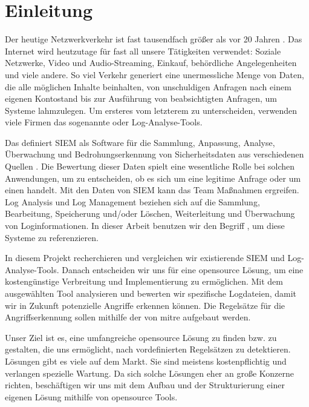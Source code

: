 \section{Einleitung}

Der heutige Netzwerkverkehr ist fast tausendfach größer als vor 20 Jahren \citep{Roser_I}. Das Internet wird heutzutage für fast all unsere Tätigkeiten verwendet: Soziale Netzwerke, Video und Audio-Streaming, Einkauf, behördliche Angelegenheiten und viele andere. So viel Verkehr generiert eine unermessliche Menge von Daten, die alle möglichen Inhalte beinhalten, von unschuldigen Anfragen nach einem eigenen Kontostand bis zur Ausführung von beabsichtigten Anfragen, um Systeme lahmzulegen. Um ersteres vom letzterem zu unterscheiden, verwenden viele Firmen das sogenannte  oder Log-Analyse-Tools. 

Das  definiert \gls{SIEM} als Software für die Sammlung, Anpassung, Analyse, Überwachung und Bedrohungserkennung von Sicherheitsdaten aus verschiedenen Quellen \citep{NIST_Definitions}. Die Bewertung dieser Daten spielt eine wesentliche Rolle bei solchen Anwendungen, um zu entscheiden, ob es sich um eine legitime Anfrage oder um einen  handelt. Mit den Daten von \gls{SIEM} kann das  Team Maßnahmen ergreifen. Log Analysis und Log Management beziehen sich auf die Sammlung, Bearbeitung, Speicherung und/oder Löschen, Weiterleitung und Überwachung von Loginformationen. In dieser Arbeit benutzen wir den Begriff , um diese Systeme zu referenzieren.

In diesem Projekt recherchieren und vergleichen wir existierende \gls{SIEM} und Log-Analyse-Tools. Danach entscheiden wir uns für eine \gls{opensource} Lösung, um eine kostengünstige Verbreitung und Implementierung zu ermöglichen. Mit dem ausgewählten Tool analysieren und bewerten wir spezifische Logdateien, damit wir in Zukunft potenzielle Angriffe erkennen können. Die Regelsätze für die Angriffserkennung sollen mithilfe der  von \gls{mitre} aufgebaut werden.

\newpage
Unser Ziel ist es, eine umfangreiche \gls{opensource} Lösung zu finden bzw. zu gestalten, die uns ermöglicht,  nach vordefinierten Regelsätzen zu detektieren.  Lösungen gibt es viele auf dem Markt. Sie sind meistens kostenpflichtig und verlangen spezielle Wartung. Da sich solche Lösungen eher an große Konzerne richten, beschäftigen wir uns mit dem Aufbau und der Strukturierung einer eigenen Lösung mithilfe von \gls{opensource} Tools. 

